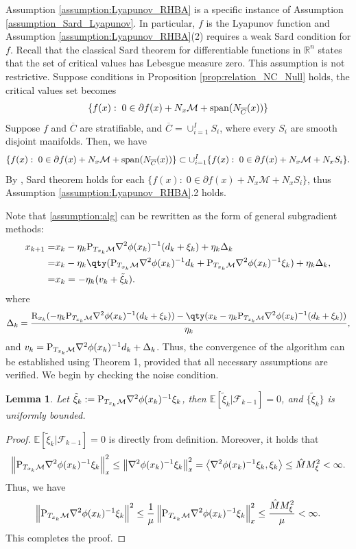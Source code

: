 \documentclass[11pt]{article}
\newcommand{\E}{\mathbb{E}}
\newcommand{\cF}{\mathcal F}
\newcommand{\cM}{\mathcal M}
\def\norm#1{\left\|#1\right\|}
\def\inner#1{\left\langle#1\right\rangle}
\newtheorem{lemma}{Lemma}[section]
\begin{document}
Assumption \ref{assumption:Lyapunov_RHBA} is a specific instance of Assumption \ref{assumption_Sard_Lyapunov}. In particular, $f$ is the Lyapunov function and Assumption \ref{assumption:Lyapunov_RHBA}(2) requires a weak Sard condition for \(f\). Recall that the classical Sard theorem for differentiable functions in \(\mathbb{R}^n\) states that the set of critical values has Lebesgue measure zero.  
This assumption is not restrictive. Suppose conditions in Proposition \ref{prop:relation_NC_Null} holds, the critical values set becomes
\[
\{f(x):\;0\in\partial f(x)+N_{x}\cM+{\rm span}(N_{\overline{C}}(x))\}
\]
Suppose $f$ and $\overline{C}$ are stratifiable, and $\overline{C}=\cup_{i=1}^IS_i$, where every $S_i$ are smooth disjoint manifolds. Then, we have
\[
\{f(x):\;0\in\partial f(x)+N_{x}\cM+{\rm span}(N_{\overline{C}}(x))\}\subset\cup_{i=1}^I\{f(x):\;0\in\partial f(x)+N_{x}\cM+N_{x}S_i\}.
\]
By \cite{bolte2007clarke}, Sard theorem holds for each $\{f(x):\;0\in\partial f(x)+N_{x}\cM+N_{x}S_i\}$, thus Assumption \ref{assumption:Lyapunov_RHBA}.2 holds. 

Note that \eqref{assumption:alg} can be rewritten as the form of general subgradient methods:
\begin{equation}
\label{eq:alg-RHBA-reform}
\begin{aligned}
x_{k+1}=&x_k-\eta_k{\rm P}_{T_{x_k}\cM}\nabla^2\phi(x_k)^{-1}(d_k+\xi_k)+ \eta_k\Delta_k\\
=&x_k-\eta_k\qty({\rm P}_{T_{x_k}\cM}\nabla^2\phi(x_k)^{-1}d_k+{\rm P}_{T_{x_k}\cM}\nabla^2\phi(x_k)^{-1}\xi_k)+\eta_k\Delta_k,\\
=&x_k=-\eta_k(v_k+\tilde\xi_k).
\end{aligned}
\end{equation}
where 
\[
\Delta_k=\frac{{\rm R}_{x_k}(-\eta_k{\rm P}_{T_{x_k}\cM}\nabla^2\phi(x_k)^{-1}(d_k+\xi_k))-\qty(x_k-\eta_k{\rm P}_{T_{x_k}\cM}\nabla^2\phi(x_k)^{-1}(d_k+\xi_k))}{\eta_k},
\]
and $v_k={\rm P}_{T_{x_k}\cM}\nabla^2\phi(x_k)^{-1}d_k+\Delta_k$.
Thus, the convergence of the algorithm can be established using Theorem 1, provided that all necessary assumptions are verified. We begin by checking the noise condition.

\begin{lemma}
\label{le:noise_ass}
Let $\tilde\xi_k:={\rm P}_{T_{x_k}\cM}\nabla^2\phi(x_k)^{-1}\xi_k$, then $\E[\tilde\xi_k|\cF_{k-1}]=0$, and $\{\tilde\xi_k\}$ is uniformly bounded.
\end{lemma}
\begin{proof}
$\E[\tilde\xi_k|\cF_{k-1}]=0$ is directly from definition. Moreover, it holds that
\[
\norm{{\rm P}_{T_{x_k}\cM}\nabla^2\phi(x_k)^{-1}\xi_k}_x^2\leq\norm{\nabla^2\phi(x_k)^{-1}\xi_k}_x^2=\inner{\nabla^2\phi(x_k)^{-1}\xi_k,\xi_k}\leq \hat MM_\xi^2<\infty.
\]
Thus, we have
\[
\begin{aligned}
\norm{{\rm P}_{T_{x_k}\cM}\nabla^2\phi(x_k)^{-1}\xi_k}^2\leq\frac{1}{\mu}\norm{{\rm P}_{T_{x_k}\cM}\nabla^2\phi(x_k)^{-1}\xi_k}_x^2\leq\frac{\hat MM_\xi^2}{\mu}<\infty.
\end{aligned}
\]
This completes the proof.
\end{proof}
\end{document}
